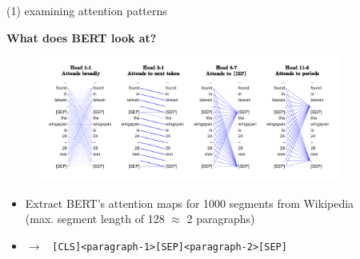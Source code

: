 \begin{frame}{(1) examining attention patterns}

\vfill

\textbf{What does BERT look at?} 

	\begin{figure}
		\centering
		\includegraphics[width = 10cm]{figure/51-what-bert-look-at.png}
	\end{figure}
	
	\begin{itemize}
		\item Extract BERT's attention maps for 1000 segments from Wikipedia\\
					(max. segment length of 128 $\approx$ 2 paragraphs)
		\item[] $\to$ \texttt{ [CLS]<paragraph-1>[SEP]<paragraph-2>[SEP]}
	\end{itemize}
	
\vfill

\end{frame}


